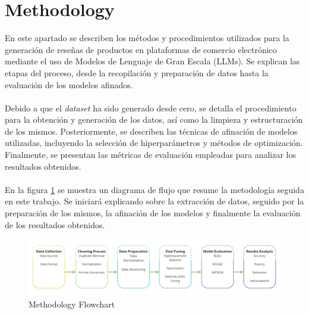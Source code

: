 \section{Methodology}
En este apartado se describen los métodos y procedimientos utilizados para la generación de reseñas de productos en plataformas de comercio electrónico mediante el uso de Modelos de Lenguaje de Gran Escala (LLMs). Se explican las etapas del proceso, desde la recopilación y preparación de datos hasta la evaluación de los modelos afinados. 
\\\\
Debido a que el \textit{dataset} ha sido generado desde cero, se detalla el procedimiento para la obtenci\'on y generación de los datos, así como la limpieza y estructuración de los mismos. Posteriormente, se describen las técnicas de afinación de modelos utilizadas, incluyendo la selección de hiperparámetros y métodos de optimización. Finalmente, se presentan las métricas de evaluación empleadas para analizar los resultados obtenidos.
\\\\
En la figura \ref{fig:MethodologyFlowchart} se muestra un diagrama de flujo que resume la metodología seguida en este trabajo. Se iniciar\'a explicando sobre la extracci\'on de datos, seguido por la preparaci\'on de los mismos, la afinaci\'on de los modelos y finalmente la evaluaci\'on de los resultados obtenidos.

\begin{figure}[H]
    \centering
    \includegraphics[width=12cm]{images/Methodology.jpg}
    \caption{Methodology Flowchart}
    \label{fig:MethodologyFlowchart}
\end{figure}